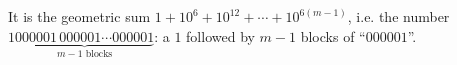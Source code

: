 It is the geometric sum $1+10^6+10^{12}+\cdots+10^{6(m-1)}$, i.e. the number $\boxed{1\underbrace{000001\,000001\cdots000001}_{m-1\text{ blocks}}}$: a $1$ followed by $m-1$ blocks of ``$000001$''.
